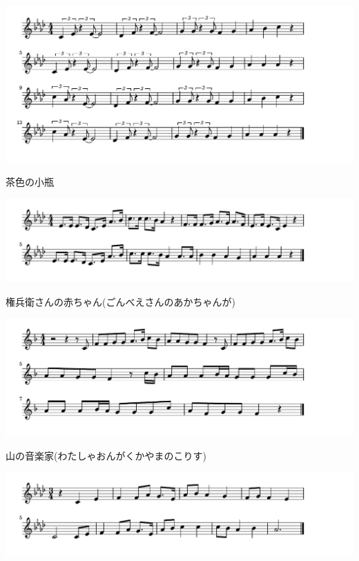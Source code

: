 \documentclass[a4paper]{ltjsarticle}
\begin{document}
\includegraphics[clip]{chairo_crop.pdf}

\vspace{-10mm} \hspace{10mm}
茶色の小瓶

\includegraphics[clip]{gonbe_crop.pdf}

\vspace{-10mm} \hspace{10mm}
権兵衛さんの赤ちゃん(ごんべえさんのあかちゃんが)

\includegraphics[clip]{yamanoongakuka_crop.pdf}

\vspace{-10mm} \hspace{10mm}
山の音楽家(わたしゃおんがくかやまのこりす)

\includegraphics[clip]{mokusei_crop.pdf}
\end{document}
